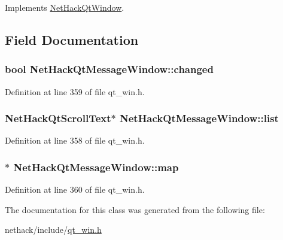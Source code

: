 Implements \hyperlink{classNetHackQtWindow_a454ce97ef84b9c19e4ec168472875c5b}{Net\+Hack\+Qt\+Window}.



\subsection{Field Documentation}
\hypertarget{classNetHackQtMessageWindow_a09f9f73768ca2189c3d65c7ff233bd01}{
\subsubsection[{changed}]{\setlength{\rightskip}{0pt plus 5cm}bool Net\+Hack\+Qt\+Message\+Window\+::changed\hspace{0.3cm}{\ttfamily [private]}}}\label{classNetHackQtMessageWindow_a09f9f73768ca2189c3d65c7ff233bd01}


Definition at line 359 of file qt\+\_\+win.\+h.

\hypertarget{classNetHackQtMessageWindow_a95a5e75311d9e88d180cdf0744fe71c7}{
\subsubsection[{list}]{\setlength{\rightskip}{0pt plus 5cm}Net\+Hack\+Qt\+Scroll\+Text$\ast$ Net\+Hack\+Qt\+Message\+Window\+::list\hspace{0.3cm}{\ttfamily [private]}}}\label{classNetHackQtMessageWindow_a95a5e75311d9e88d180cdf0744fe71c7}


Definition at line 358 of file qt\+\_\+win.\+h.

\hypertarget{classNetHackQtMessageWindow_a0a6b00320c6effcec6aa02f7d73e61bb}{
\subsubsection[{map}]{$\ast$ Net\+Hack\+Qt\+Message\+Window\+::map\hspace{0.3cm}{\ttfamily [private]}}}\label{classNetHackQtMessageWindow_a0a6b00320c6effcec6aa02f7d73e61bb}


Definition at line 360 of file qt\+\_\+win.\+h.



The documentation for this class was generated from the following file\+:\begin{DoxyCompactItemize}
\item 
nethack/include/\hyperlink{qt__win_8h}{qt\+\_\+win.\+h}\end{DoxyCompactItemize}

